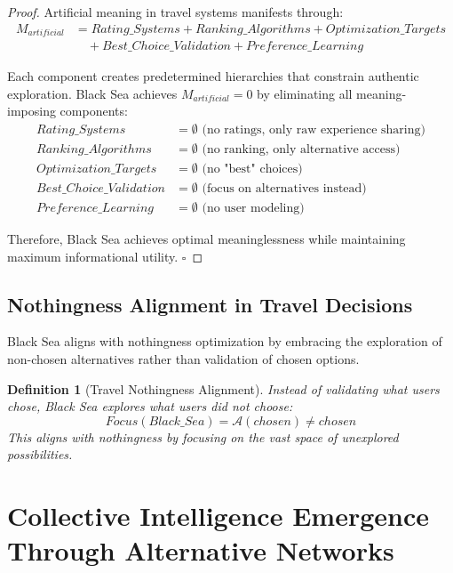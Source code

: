 \documentclass[12pt,a4paper]{article}
\newtheorem{definition}{Definition}
\begin{document}
\begin{proof}
Artificial meaning in travel systems manifests through:
\begin{align}
M_{artificial} &= Rating\_Systems + Ranking\_Algorithms + Optimization\_Targets \\
&\quad + Best\_Choice\_Validation + Preference\_Learning
\end{align}

Each component creates predetermined hierarchies that constrain authentic exploration. Black Sea achieves $M_{artificial} = 0$ by eliminating all meaning-imposing components:
\begin{align}
Rating\_Systems &= \emptyset \text{ (no ratings, only raw experience sharing)} \\
Ranking\_Algorithms &= \emptyset \text{ (no ranking, only alternative access)} \\
Optimization\_Targets &= \emptyset \text{ (no "best" choices)} \\
Best\_Choice\_Validation &= \emptyset \text{ (focus on alternatives instead)} \\
Preference\_Learning &= \emptyset \text{ (no user modeling)}
\end{align}

Therefore, Black Sea achieves optimal meaninglessness while maintaining maximum informational utility. $\square$
\end{proof}

\subsection{Nothingness Alignment in Travel Decisions}

Black Sea aligns with nothingness optimization by embracing the exploration of non-chosen alternatives rather than validation of chosen options.

\begin{definition}[Travel Nothingness Alignment]
Instead of validating what users chose, Black Sea explores what users did not choose:
\begin{equation}
Focus(Black\_Sea) = \mathcal{A}(chosen) \not= chosen
\end{equation}
This aligns with nothingness by focusing on the vast space of unexplored possibilities.
\end{definition}

\section{Collective Intelligence Emergence Through Alternative Networks}
\end{document}
